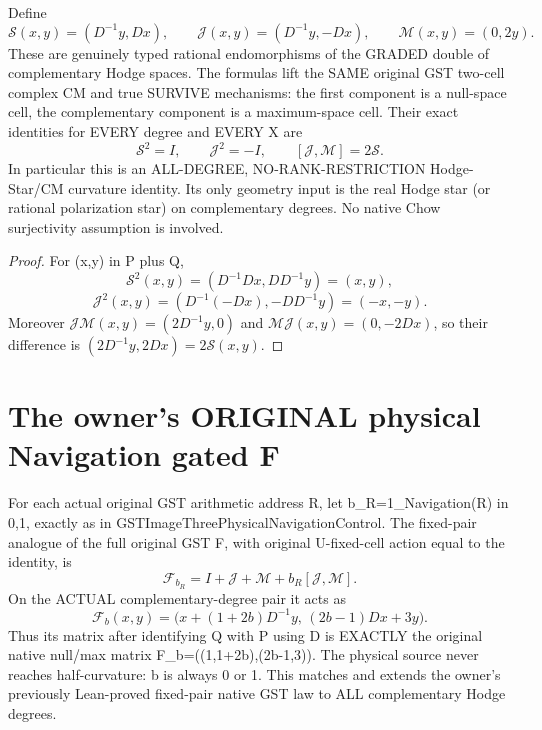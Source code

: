 \documentclass[11pt]{article}
\begin{document}
Define
\[
\mathscr S(x,y)=(D^{-1}y,Dx),\qquad
\mathscr J(x,y)=(D^{-1}y,-Dx),\qquad
\mathscr M(x,y)=(0,2y).
\]
These are genuinely typed rational endomorphisms
of the GRADED double of complementary Hodge spaces.
The formulas lift the SAME original GST two-cell
complex CM and true SURVIVE mechanisms:
the first component is a null-space cell,
the complementary component is a maximum-space cell.
Their exact identities for EVERY degree and EVERY X are
\[
\boxed{
\mathscr S^2=I,\qquad
\mathscr J^2=-I,\qquad
[\mathscr J,\mathscr M]=2\mathscr S.
}\tag{1}
\]
In particular this is an ALL-DEGREE,
NO-RANK-RESTRICTION Hodge-Star/CM curvature
identity. Its only geometry input is the
real Hodge star (or rational polarization star)
on complementary degrees. No native Chow
surjectivity assumption is involved.

\begin{proof}
For (x,y) in P plus Q,
\[
\mathscr S^2(x,y)
=(D^{-1}Dx,DD^{-1}y)=(x,y),
\]
\[
\mathscr J^2(x,y)
=(D^{-1}(-Dx),-DD^{-1}y)=(-x,-y).
\]
Moreover
\(\mathscr J\mathscr M(x,y)=(2D^{-1}y,0)\)
and
\(\mathscr M\mathscr J(x,y)=(0,-2Dx)\),
so their difference is
\((2D^{-1}y,2Dx)=2\mathscr S(x,y)\).
\end{proof}

\section{The owner's ORIGINAL physical Navigation gated F}
For each actual original GST arithmetic address R,
let b_R=1_Navigation(R) in {0,1},
exactly as in GSTImageThreePhysicalNavigationControl.
The fixed-pair analogue of the full original GST F,
with original U-fixed-cell action equal to the identity,
is
\[
\mathscr F_{b_R}
=I+\mathscr J+\mathscr M+
 b_R[\mathscr J,\mathscr M].
\]
On the ACTUAL complementary-degree pair it acts as
\[
\boxed{
\mathscr F_b(x,y)
=\bigl(x+(1+2b)D^{-1}y,\,
       (2b-1)Dx+3y\bigr).
}\tag{2}
\]
Thus its matrix after identifying Q with P
using D is EXACTLY the original native null/max
matrix F_b=((1,1+2b),(2b-1,3)).
The physical source never reaches half-curvature:
b is always 0 or 1.
This matches and extends the owner's previously
Lean-proved fixed-pair native GST law to
ALL complementary Hodge degrees.
\end{document}
